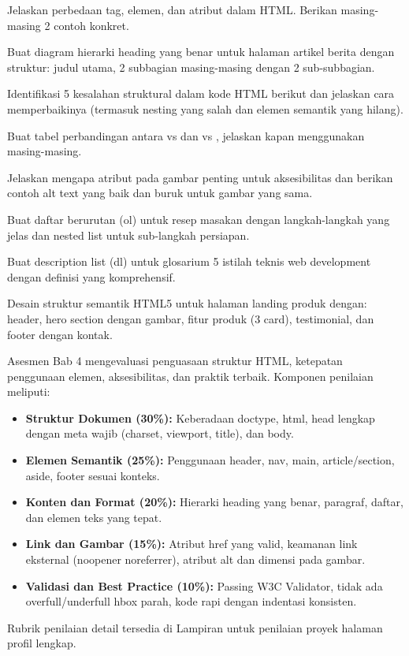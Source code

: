\documentclass[../main.tex]{subfiles}
\begin{document}
\begin{latihan}
  \item Jelaskan perbedaan tag, elemen, dan atribut dalam HTML. Berikan masing-masing 2 contoh konkret.
  \item Buat diagram hierarki heading yang benar untuk halaman artikel berita dengan struktur: judul utama, 2 subbagian masing-masing dengan 2 sub-subbagian.
  \item Identifikasi 5 kesalahan struktural dalam kode HTML berikut dan jelaskan cara memperbaikinya (termasuk nesting yang salah dan elemen semantik yang hilang).
  \item Buat tabel perbandingan antara  vs  dan  vs , jelaskan kapan menggunakan masing-masing.
  \item Jelaskan mengapa atribut  pada gambar penting untuk aksesibilitas dan berikan contoh alt text yang baik dan buruk untuk gambar yang sama.
  \item Buat daftar berurutan (ol) untuk resep masakan dengan langkah-langkah yang jelas dan nested list untuk sub-langkah persiapan.
  \item Buat description list (dl) untuk glosarium 5 istilah teknis web development dengan definisi yang komprehensif.
  \item Desain struktur semantik HTML5 untuk halaman landing produk dengan: header, hero section dengan gambar, fitur produk (3 card), testimonial, dan footer dengan kontak.
\end{latihan}

\begin{asesmen}
Asesmen Bab 4 mengevaluasi penguasaan struktur HTML, ketepatan penggunaan elemen, aksesibilitas, dan praktik terbaik. Komponen penilaian meliputi:

\begin{itemize}[leftmargin=*]
  \item \textbf{Struktur Dokumen (30\%):} Keberadaan doctype, html, head lengkap dengan meta wajib (charset, viewport, title), dan body.
  \item \textbf{Elemen Semantik (25\%):} Penggunaan header, nav, main, article/section, aside, footer sesuai konteks.
  \item \textbf{Konten dan Format (20\%):} Hierarki heading yang benar, paragraf, daftar, dan elemen teks yang tepat.
  \item \textbf{Link dan Gambar (15\%):} Atribut href yang valid, keamanan link eksternal (noopener noreferrer), atribut alt dan dimensi pada gambar.
  \item \textbf{Validasi dan Best Practice (10\%):} Passing W3C Validator, tidak ada overfull/underfull hbox parah, kode rapi dengan indentasi konsisten.
\end{itemize}

Rubrik penilaian detail tersedia di Lampiran untuk penilaian proyek halaman profil lengkap.
\end{asesmen}
\end{document}
